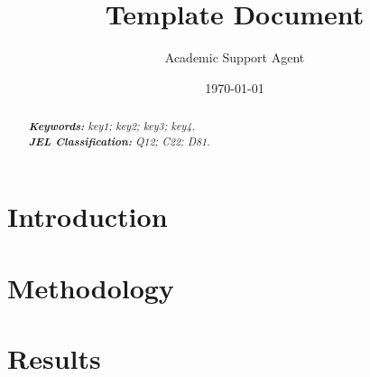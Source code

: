 \documentclass{article}
\title{Template Document}
\author{Academic Support Agent}
\date{\today}
\begin{document}
\maketitle

{
\maketitle
\begin{abstract}

\lipsum[1] %

\noindent
\textit{\textbf{Keywords: }%
key1; key2; key3; key4.} \\ %
\noindent
\textit{\textbf{JEL Classification: }%
Q12; C22; D81.} %

\end{abstract}
}


\section{Introduction}

\lipsum[2-5] %
\citet{Hardaker2004} %

\section{Methodology}

\lipsum[7-9] %
\citep{Chavas2015} %

\section{Results}
\end{document}
